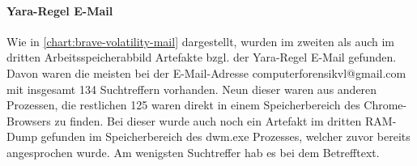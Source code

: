 \paragraph*{Yara-Regel \glqq{}E-Mail\grqq{}}\label{chap:ergebnisse-brave-uncommon-locations-volatility-email}

Wie in \autoref{chart:brave-volatility-mail} dargestellt, wurden im zweiten als auch im dritten Arbeitsspeicherabbild Artefakte bzgl. der Yara-Regel \glqq{}E-Mail\grqq{} gefunden. Davon waren die meisten bei der E-Mail-Adresse \glqq{}computerforensikvl@gmail.com\grqq{} mit insgesamt 134 Suchtreffern vorhanden. Neun dieser waren aus anderen Prozessen, die restlichen 125 waren direkt in einem Speicherbereich des Chrome-Browsers zu finden. Bei dieser wurde auch noch ein Artefakt im dritten RAM-Dump gefunden im Speicherbereich des dwm.exe Prozesses, welcher zuvor bereits angesprochen wurde. Am wenigsten Suchtreffer hab es bei dem Betrefftext.

